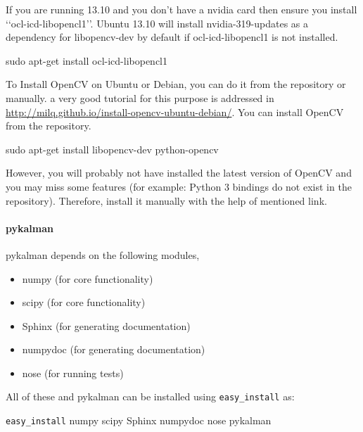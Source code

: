 \documentclass[[12pt,DIV14,BCOR12mm,a4paper,footexclude,headinclude,halfparskip-,twoside,openright,cleardoubleempty,idxtotoc,bibtotoc]{article}
\begin{document}
 If you are running 13.10 and you don't have a nvidia card then ensure you install \lq\lq ocl-icd-libopencl1\rq\rq. Ubuntu 13.10 will install nvidia-319-updates as a dependency for libopencv-dev by default if ocl-icd-libopencl1 is not installed.

 \begin{framed}

sudo apt-get install ocl-icd-libopencl1

\end{framed} 


To Install OpenCV on Ubuntu or Debian, you can do it from the repository or manually. a very good tutorial for this purpose is addressed in \url{http://milq.github.io/install-opencv-ubuntu-debian/}. You can install OpenCV from the repository.

 \begin{framed}

sudo apt-get install libopencv-dev python-opencv

\end{framed} 

However, you will probably not have installed the latest version of OpenCV and you may miss some features (for example: Python 3 bindings do not exist in the repository). Therefore, install it manually with the help of mentioned link.

\paragraph{pykalman}

pykalman depends on the following modules,


\begin{itemize}

\item numpy (for core functionality)
\item scipy (for core functionality)
\item Sphinx (for generating documentation)
\item numpydoc (for generating documentation)
\item nose (for running tests)

\end{itemize}

All of these and pykalman can be installed using \texttt{easy\_install}  as:

 \begin{framed}

\texttt{easy\_install} numpy scipy Sphinx numpydoc nose pykalman

\end{framed} 
\end{document}
